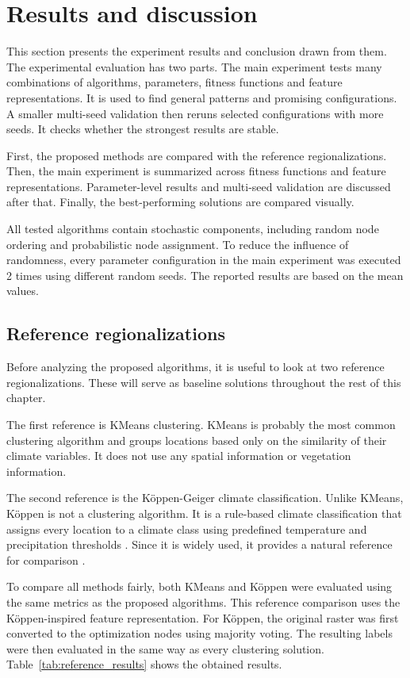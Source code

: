 \documentclass[11pt]{article}
\begin{document}
\section{Results and discussion}
\label{sec:results}
This section presents the experiment results and conclusion drawn from them. The experimental evaluation has two parts. The main experiment tests many combinations of algorithms, parameters, fitness functions and feature representations. It is used to find general patterns and promising configurations. A smaller multi-seed validation then reruns selected configurations with more seeds. It checks whether the strongest results are stable.

First, the proposed methods are compared with the reference regionalizations. Then, the main experiment is summarized across fitness functions and feature representations. Parameter-level results and multi-seed validation are discussed after that. Finally, the best-performing solutions are compared visually.

All tested algorithms contain stochastic components, including random node ordering and probabilistic node assignment. To reduce the influence of randomness, every parameter configuration in the main experiment was executed 2 times using different random seeds. The reported results are based on the mean values.


\subsection{Reference regionalizations}
Before analyzing the proposed algorithms, it is useful to look at two reference regionalizations. These will serve as baseline solutions throughout the rest of this chapter.

The first reference is KMeans clustering. KMeans is probably the most common clustering algorithm and groups locations based only on the similarity of their climate variables. It does not use any spatial information or vegetation information.

The second reference is the Köppen-Geiger climate classification. Unlike KMeans, Köppen is not a clustering algorithm. It is a rule-based climate classification that assigns every location to a climate class using predefined temperature and precipitation thresholds \cite{koppen1936,peel2007}. Since it is widely used, it provides a natural reference for comparison \cite{peel2007,beck2018}.

To compare all methods fairly, both KMeans and Köppen were evaluated using the same metrics as the proposed algorithms. This reference comparison uses the Köppen-inspired feature representation. For Köppen, the original raster was first converted to the optimization nodes using majority voting. The resulting labels were then evaluated in the same way as every clustering solution. Table~\ref{tab:reference_results} shows the obtained results.
\end{document}
